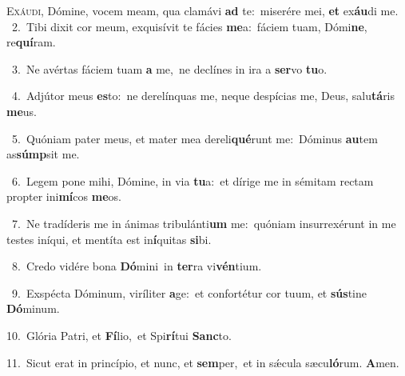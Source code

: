 \lettrine{\initial\textcolor{\initialcolor}{E}}{xáudi,} Dómine, vocem meam, qua clamávi \textbf{ad} te:~\star miserére mei, \textbf{et} ex\-\textbf{áu}\-di me.\\
{\numbfont\textcolor{\numbcolor}{~2.}}~Tibi dixit cor meum, exquisívit te fácies \textbf{me}\-a:~\star fáciem tuam, Dómi\-\textbf{ne}\-, re\-\textbf{quí}\-ram.\par
{\numbfont\textcolor{\numbcolor}{~3.}}~Ne avértas fáciem tuam \textbf{a} me,~\star ne declínes in ira a \textbf{ser}\-vo \textbf{tu}\-o.\par
{\numbfont\textcolor{\numbcolor}{~4.}}~Adjútor meus \textbf{es}\-to:~\star ne derelínquas me, neque despícias me, Deus, salu\-\textbf{tá}\-ris \textbf{me}\-us.\par
{\numbfont\textcolor{\numbcolor}{~5.}}~Quóniam pater meus, et mater mea dereli\-\textbf{qué}\-runt me:~\star Dóminus \textbf{au}\-tem as\-\textbf{súmp}\-sit me.\par
{\numbfont\textcolor{\numbcolor}{~6.}}~Legem pone mihi, Dómine, in via \textbf{tu}\-a:~\star et dírige me in sémitam rectam propter ini\-\textbf{mí}\-cos \textbf{me}\-os.\par
{\numbfont\textcolor{\numbcolor}{~7.}}~Ne tradíderis me in ánimas tribulánti\textbf{um} me:~\star quóniam insurrexérunt in me testes iníqui, et mentíta est in\-\textbf{í}\-quitas \textbf{si}\-bi.\par
{\numbfont\textcolor{\numbcolor}{~8.}}~Credo vidére bona \textbf{Dó}\-mini~\star in \textbf{ter}\-ra vi\-\textbf{vén}\-tium.\par
{\numbfont\textcolor{\numbcolor}{~9.}}~Exspécta Dóminum, viríliter \textbf{a}\-ge:~\star et confortétur cor tuum, et \textbf{sús}\-tine \textbf{Dó}\-minum.\par
{\numbfont\textcolor{\numbcolor}{10.}}~Glória Patri, et \textbf{Fí}\-lio,~\star et Spi\-\textbf{rí}\-tui \textbf{Sanc}\-to.\par
{\numbfont\textcolor{\numbcolor}{11.}}~Sicut erat in princípio, et nunc, et \textbf{sem}\-per,~\star et in sǽcula sæcu\-\textbf{ló}\-rum. \textbf{A}\-men.\par
